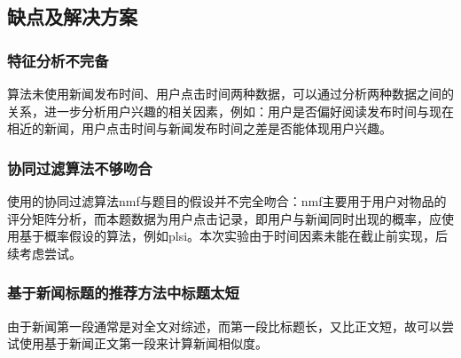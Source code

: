 \documentclass[UTF8]{article}
\begin{document}
\subsection{缺点及解决方案}
\subsubsection{特征分析不完备}
算法未使用新闻发布时间、用户点击时间两种数据，可以通过分析两种数据之间的关系，进一步分析用户兴趣的相关因素，例如：用户是否偏好阅读发布时间与现在相近的新闻，用户点击时间与新闻发布时间之差是否能体现用户兴趣。
\subsubsection{协同过滤算法不够吻合}
使用的协同过滤算法nmf与题目的假设并不完全吻合：nmf主要用于用户对物品的评分矩阵分析，而本题数据为用户点击记录，即用户与新闻同时出现的概率，应使用基于概率假设的算法，例如plsi。本次实验由于时间因素未能在截止前实现，后续考虑尝试。
\subsubsection{基于新闻标题的推荐方法中标题太短}
由于新闻第一段通常是对全文对综述，而第一段比标题长，又比正文短，故可以尝试使用基于新闻正文第一段来计算新闻相似度。
\end{document}
